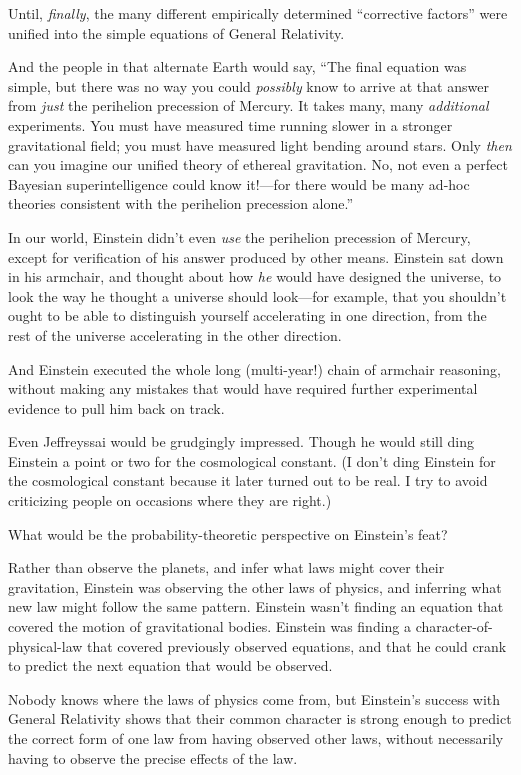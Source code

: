 {
 Until, \textit{finally}, the many different empirically determined
``corrective factors'' were unified
into the simple equations of General Relativity.}

{
 And the people in that alternate Earth would say,
``The final equation was simple, but there was no way
you could \textit{possibly} know to arrive at that answer from
\textit{just} the perihelion precession of Mercury. It takes many, many
\textit{additional} experiments. You must have measured time running
slower in a stronger gravitational field; you must have measured light
bending around stars. Only \textit{then} can you imagine our unified
theory of ethereal gravitation. No, not even a perfect Bayesian
superintelligence could know it!---for there would be many ad-hoc
theories consistent with the perihelion precession
alone.''}

{
 In our world, Einstein didn't even \textit{use}
the perihelion precession of Mercury, except for verification of his
answer produced by other means. Einstein sat down in his armchair, and
thought about how \textit{he} would have designed the universe, to look
the way he thought a universe should look---for example, that you
shouldn't ought to be able to distinguish yourself
accelerating in one direction, from the rest of the universe
accelerating in the other direction.}

{
 And Einstein executed the whole long (multi-year!) chain of
armchair reasoning, without making any mistakes that would have
required further experimental evidence to pull him back on track.}

{
 Even Jeffreyssai would be grudgingly impressed. Though he would
still ding Einstein a point or two for the cosmological constant. (I
don't ding Einstein for the cosmological constant
because it later turned out to be real. I try to avoid criticizing
people on occasions where they are right.)}

{
 What would be the probability-theoretic perspective on
Einstein's feat?}

{
 Rather than observe the planets, and infer what laws might cover
their gravitation, Einstein was observing the other laws of physics,
and inferring what new law might follow the same pattern. Einstein
wasn't finding an equation that covered the motion of
gravitational bodies. Einstein was finding a character-of-physical-law
that covered previously observed equations, and that he could crank to
predict the next equation that would be observed.}

{
 Nobody knows where the laws of physics come from, but
Einstein's success with General Relativity shows that
their common character is strong enough to predict the correct form of
one law from having observed other laws, without necessarily having to
observe the precise effects of the law.}

